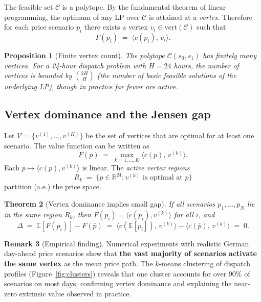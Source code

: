 \documentclass[11pt, a4paper]{article}
\theoremstyle{plain}
\newtheorem{theorem}{Theorem}[section]
\newtheorem{proposition}[theorem]{Proposition}
\theoremstyle{definition}
\newtheorem{remark}[theorem]{Remark}
\newcommand{\E}{\mathbb{E}}
\newcommand{\R}{\mathbb{R}}
\newcommand{\C}{\mathcal{C}}
\newcommand{\pbar}{\bar{p}}
\begin{document}
The feasible set $\C$ is a polytope.  By the fundamental theorem of
linear programming, the optimum of any LP over $\C$ is attained at a
\emph{vertex}.  Therefore for each price scenario $p_i$ there exists
a vertex $v_i \in \mathrm{vert}(\C)$ such that
\begin{equation}
  F(p_i) \;=\; \langle c(p_i),\, v_i \rangle.
\end{equation}

\begin{proposition}[Finite vertex count]
The polytope $\C(s_0, s_1)$ has finitely many vertices.
For a 24-hour dispatch problem with $H = 24$ hours,
the number of vertices is bounded by $\binom{2H}{H}$ (the number of
basic feasible solutions of the underlying LP),
though in practice far fewer are active.
\end{proposition}

\subsection{Vertex dominance and the Jensen gap}

Let $\mathcal{V} = \{v^{(1)}, \ldots, v^{(K)}\}$ be the set of vertices
that are optimal for at least one scenario.  The value function can be
written as
\begin{equation}
  F(p) \;=\; \max_{k=1,\ldots,K} \langle c(p),\, v^{(k)} \rangle.
\end{equation}
Each $p \mapsto \langle c(p), v^{(k)} \rangle$ is linear.
The \emph{active vertex regions}
\begin{equation}
  R_k \;=\; \{p \in \R^{24} : v^{(k)} \text{ is optimal at } p\}
\end{equation}
partition (a.e.) the price space.

\begin{theorem}[Vertex dominance implies small gap]
  If all scenarios $p_1, \ldots, p_N$ lie in the same region $R_k$,
  then $F(p_i) = \langle c(p_i), v^{(k)} \rangle$ for all $i$, and
  \begin{equation}
    \Delta
    \;=\;
    \E[F(p_i)] - F(\pbar)
    \;=\;
    \bigl\langle c(\E[p_i]),\, v^{(k)} \bigr\rangle
    - \bigl\langle c(\pbar),\, v^{(k)} \bigr\rangle
    \;=\; 0.
  \end{equation}
\end{theorem}

\begin{remark}[Empirical finding]
  Numerical experiments with realistic German day-ahead price scenarios
  show that \textbf{the vast majority of scenarios activate the same vertex}
  as the mean price path.  The $k$-means clustering of dispatch profiles
  (Figure~\ref{fig:clusters}) reveals that one cluster accounts for
  over 90\% of scenarios on most days, confirming vertex dominance and
  explaining the near-zero extrinsic value observed in practice.
\end{remark}
\end{document}
